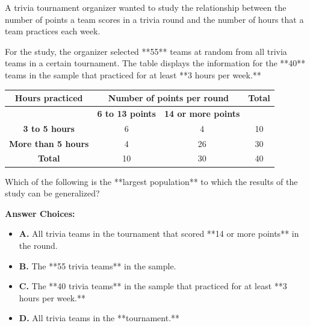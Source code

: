 \documentclass[12pt]{article}
\begin{document}
\begin{tcolorbox}[colback=green!10, colframe=green!50!black, title=Question 2: Statistical Generalization]
A trivia tournament organizer wanted to study the relationship between the number of points a team scores in a trivia round and the number of hours that a team practices each week. 

For the study, the organizer selected **55** teams at random from all trivia teams in a certain tournament. The table displays the information for the **40** teams in the sample that practiced for at least **3 hours per week.**

\begin{center}
\begin{tabular}{|c|c|c|c|}
\hline
\textbf{Hours practiced} & \multicolumn{2}{c|}{\textbf{Number of points per round}} & \textbf{Total} \\
\hline
 & \textbf{6 to 13 points} & \textbf{14 or more points} &  \\
\hline
\textbf{3 to 5 hours} & 6 & 4 & 10 \\
\textbf{More than 5 hours} & 4 & 26 & 30 \\
\hline
\textbf{Total} & 10 & 30 & 40 \\
\hline
\end{tabular}
\end{center}

Which of the following is the **largest population** to which the results of the study can be generalized?

\textbf{Answer Choices:}
\begin{itemize}
    \item \textbf{A.} All trivia teams in the tournament that scored **14 or more points** in the round.
    \item \textbf{B.} The **55 trivia teams** in the sample.
    \item \textbf{C.} The **40 trivia teams** in the sample that practiced for at least **3 hours per week.**
    \item \textbf{D.} All trivia teams in the **tournament.**
\end{itemize}

\end{tcolorbox}
\end{document}
